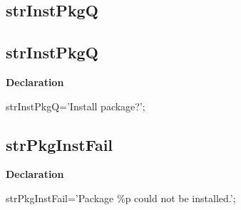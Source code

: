 \documentclass{report}
\newif\ifpdf
\begin{document}
\subsection*{\large{\textbf{strInstPkgQ}}\normalsize\hspace{1ex}\hrulefill}
\else
\subsection*{strInstPkgQ}
\fi
\label{trstrings-strInstPkgQ}
\begin{list}{}{
\setlength{\itemindent}{0cm}
\setlength{\listparindent}{0cm}
\setlength{\leftmargin}{\evensidemargin}
\addtolength{\leftmargin}{\tmplength}
\settowidth{\labelsep}{X}
\addtolength{\leftmargin}{\labelsep}
\setlength{\labelwidth}{\tmplength}
}
\item[\textbf{Declaration}\hfill]
\ifpdf
\begin{flushleft}
\fi
\begin{ttfamily}
strInstPkgQ='Install package?';\end{ttfamily}

\ifpdf
\end{flushleft}
\fi

\end{list}
\ifpdf
\subsection*{\large{\textbf{strPkgInstFail}}\normalsize\hspace{1ex}\hrulefill}
\else
\subsection*{strPkgInstFail}
\fi
\label{trstrings-strPkgInstFail}
\begin{list}{}{
\setlength{\itemindent}{0cm}
\setlength{\listparindent}{0cm}
\setlength{\leftmargin}{\evensidemargin}
\addtolength{\leftmargin}{\tmplength}
\settowidth{\labelsep}{X}
\addtolength{\leftmargin}{\labelsep}
\setlength{\labelwidth}{\tmplength}
}
\item[\textbf{Declaration}\hfill]
\ifpdf
\begin{flushleft}
\fi
\begin{ttfamily}
strPkgInstFail='Package {\%}p could not be installed.';\end{ttfamily}

\ifpdf
\end{flushleft}
\fi

\end{list}
\ifpdf
\end{document}
